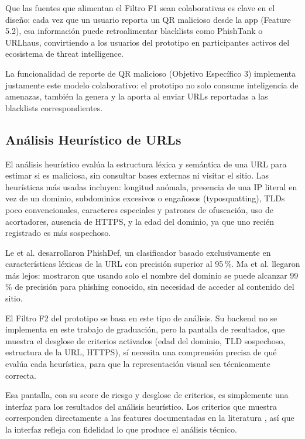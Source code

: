 Que las fuentes que alimentan el Filtro F1 sean colaborativas es clave en el dise\~no: cada vez que un usuario reporta un QR malicioso desde la app (Feature 5.2), esa informaci\'on puede retroalimentar blacklists como PhishTank o URLhaus, convirtiendo a los usuarios del prototipo en participantes activos del ecosistema de threat intelligence.

La funcionalidad de reporte de QR malicioso (Objetivo Espec\'ifico 3) implementa justamente este modelo colaborativo: el prototipo no solo consume inteligencia de amenazas, tambi\'en la genera y la aporta al enviar URLs reportadas a las blacklists correspondientes.

\subsection{An\'alisis Heur\'istico de URLs}

El an\'alisis heur\'istico eval\'ua la estructura l\'exica y sem\'antica de una URL para estimar si es maliciosa, sin consultar bases externas ni visitar el sitio. Las heur\'isticas m\'as usadas incluyen: longitud an\'omala, presencia de una IP literal en vez de un dominio, subdominios excesivos o enga\~nosos (typosquatting), TLDs poco convencionales, caracteres especiales y patrones de ofuscaci\'on, uso de acortadores, ausencia de HTTPS, y la edad del dominio, ya que uno reci\'en registrado es m\'as sospechoso.

Le et al. \cite{le2011phishdef} desarrollaron PhishDef, un clasificador basado exclusivamente en caracter\'isticas l\'exicas de la URL con precisi\'on superior al 95\,\%. Ma et al. \cite{ma2009beyond} llegaron m\'as lejos: mostraron que usando solo el nombre del dominio se puede alcanzar 99\,\% de precisi\'on para phishing conocido, sin necesidad de acceder al contenido del sitio.

El Filtro F2 del prototipo se basa en este tipo de an\'alisis. Su backend no se implementa en este trabajo de graduaci\'on, pero la pantalla de resultados, que muestra el desglose de criterios activados (edad del dominio, TLD sospechoso, estructura de la URL, HTTPS), s\'i necesita una comprensi\'on precisa de qu\'e eval\'ua cada heur\'istica, para que la representaci\'on visual sea t\'ecnicamente correcta.

Esa pantalla, con su score de riesgo y desglose de criterios, es simplemente una interfaz para los resultados del an\'alisis heur\'istico. Los criterios que muestra corresponden directamente a las features documentadas en la literatura \cite{ma2009beyond,le2011phishdef}, as\'i que la interfaz refleja con fidelidad lo que produce el an\'alisis t\'ecnico.

